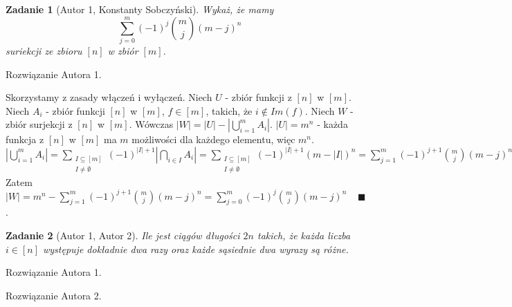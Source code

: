 \documentclass{mwart}
\newtheorem{zad}{Zadanie}[section]
\begin{document}
\begin{zad}[Autor 1, Konstanty Sobczyński]
    Wykaż, że mamy
    \[
        \sum_{j=0}^{m}(-1)^j \binom{m}{j}(m-j)^n
    \]
    suriekcji ze zbioru $[n]$ w zbiór $[m]$.
\end{zad}
\begin{mdframed}
    Rozwiązanie Autora 1.
\end{mdframed}
\begin{mdframed}
    Skorzystamy z zasady włączeń i wyłączeń. 
    Niech $U$ - zbiór funkcji z $[n]$ w $[m]$.
    \newline \newline
    Niech $A_i$ - zbiór funkcji $[n]$ w $[m]$, $f \in [m]$, takich, że $i \not\in Im(f)$.
    \newline \newline
    Niech $W$ - zbiór surjekcji z $[n]$ w $[m]$.
    \newline \newline
    Wówczas $|W| = |U| - |\bigcup_{i=1}^{m} A_i|$.
    $|U| = m^n$ - każda funkcja z $[n]$ w $[m]$ ma $m$ możliwości dla każdego elementu, więc $m^n$.
    \newline \newline
    $|\bigcup_{i=1}^{m} A_i| = \sum_{\substack{I \subseteq [m] \\ I \neq \emptyset}} (-1)^{|I|+1} |\bigcap_{i \in I} A_i| = \sum_{\substack{I \subseteq [m] \\ I \neq \emptyset}} (-1)^{|I|+1} (m - |I|)^n = \sum_{j=1}^{m}(-1)^{j+1}
    \binom{m}{j}(m-j)^n$
    \newline \newline
    Zatem $|W| = m^n - \sum_{j=1}^{m}(-1)^{j+1} \binom{m}{j}(m-j)^n = \sum_{j=0}^{m}(-1)^j \binom{m}{j}(m-j)^n\; \; \; \; \blacksquare$.

\end{mdframed}



\begin{zad}[Autor 1, Autor 2]
    Ile jest ciągów długości $2n$ takich, że każda liczba $i \in [n]$
    występuje dokładnie dwa razy oraz każde sąsiednie dwa wyrazy są różne.
\end{zad}
\begin{mdframed}
    Rozwiązanie Autora 1.
\end{mdframed}
\begin{mdframed}
    Rozwiązanie Autora 2.
\end{mdframed}
\end{document}
